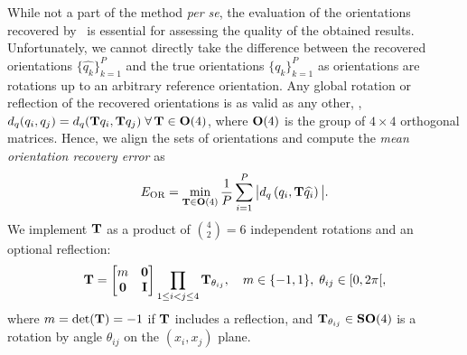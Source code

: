 While not a part of the method \textit{per se}, the evaluation of the orientations recovered by~ is essential for assessing the quality of the obtained results.
Unfortunately, we cannot directly take the difference between the recovered orientations $\{\widehat{q_k}\}_{k=1}^P$ and the true orientations $\{q_k\}_{k=1}^P$ as orientations are rotations up to an arbitrary reference orientation.
Any global rotation or reflection of the recovered orientations is as valid as any other, \ie, $d_q(q_i, q_j) = d_q(\mathbf{T} q_i , \mathbf{T} q_j) \; \forall \, \mathbf{T} \in \mathrm{\mathbf{O}}(4)$, where $\mathrm{\mathbf{O}}(4)$ is the group of $4 \times 4$ orthogonal matrices. %
Hence, we align the sets of orientations and compute the \textit{mean orientation recovery error} as
\begin{equation}
    E_\text{OR} = \min_{\mathbf{T} \in \mathrm{\mathbf{O}}(4)} \frac{1}{P} \sum_{i=1}^P \big| d_q\left( q_i, \mathbf{T} \widehat{q_i} \right) \big|.
    \label{eqn:orientation-recovery-error}
\end{equation}
We implement $\mathbf{T}$ as a product of $\binom{4}{2}=6$ independent rotations and an optional reflection:
\begin{equation*}
    \mathbf{T} =
    \begin{bmatrix}
        m & \mathbf{0} \\
        \mathbf{0} & \mathbf{I} \\
    \end{bmatrix}
    \prod_{1 \leq i < j \leq 4} \mathbf{T}_{\theta_{ij}},
    \quad m \in \{-1,1\}, \; \theta_{ij} \in [0, 2\pi[,
\end{equation*}
where $m = \det(\mathbf{T}) = -1$ if $\mathbf{T}$ includes a reflection, and $\mathbf{T}_{\theta_{ij}} \in \mathrm{\mathbf{SO}}(4)$ is a rotation by angle $\theta_{ij}$ on the $(x_i, x_j)$ plane.

